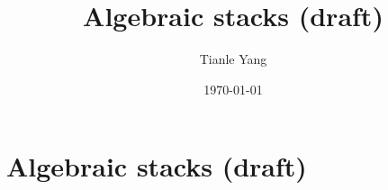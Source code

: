 \documentclass{noteformyself}
\title{Algebraic stacks (draft)}
\author{Tianle Yang}
\date{\today}
\begin{document}
    \maketitle

    \section{Algebraic stacks (draft)}



\end{document}
